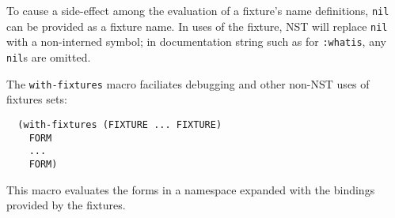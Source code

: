 To cause a side-effect among the evaluation of a fixture's name
definitions, \texttt{nil} can be provided as a fixture name.  In uses
of the fixture, NST will replace \texttt{nil} with a non-interned
symbol; in documentation string such as for \texttt{:whatis}, any
\texttt{nil}s are omitted.

The \texttt{with-fixtures} macro faciliates debugging and other
non-NST uses of fixtures sets:
\begin{verbatim}
  (with-fixtures (FIXTURE ... FIXTURE)
    FORM
    ...
    FORM)
\end{verbatim}
This macro evaluates the forms in a namespace expanded with the
bindings provided by the fixtures.


